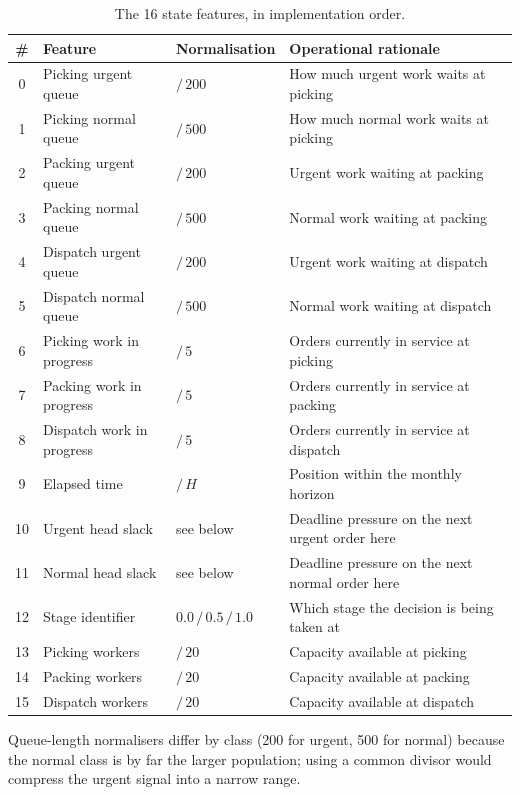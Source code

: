 \begin{table}[htbp]
\centering
\caption[RL-3 state features]{The 16 state features, in implementation order.}
\label{tab:rl-state}
\scriptsize
\begin{tabularx}{\textwidth}{clp{2.6cm}X}
\toprule
\textbf{\#} & \textbf{Feature} & \textbf{Normalisation} & \textbf{Operational rationale} \\
\midrule
0  & Picking urgent queue   & \(/\,200\) & How much urgent work waits at picking \\
1  & Picking normal queue   & \(/\,500\) & How much normal work waits at picking \\
2  & Packing urgent queue   & \(/\,200\) & Urgent work waiting at packing \\
3  & Packing normal queue   & \(/\,500\) & Normal work waiting at packing \\
4  & Dispatch urgent queue  & \(/\,200\) & Urgent work waiting at dispatch \\
5  & Dispatch normal queue  & \(/\,500\) & Normal work waiting at dispatch \\
6  & Picking work in progress  & \(/\,5\) & Orders currently in service at picking \\
7  & Packing work in progress  & \(/\,5\) & Orders currently in service at packing \\
8  & Dispatch work in progress & \(/\,5\) & Orders currently in service at dispatch \\
9  & Elapsed time & \(/\,H\) & Position within the monthly horizon \\
10 & Urgent head slack & see below & Deadline pressure on the next urgent order here \\
11 & Normal head slack & see below & Deadline pressure on the next normal order here \\
12 & Stage identifier & \(0.0\,/\,0.5\,/\,1.0\) & Which stage the decision is being taken at \\
13 & Picking workers  & \(/\,20\) & Capacity available at picking \\
14 & Packing workers  & \(/\,20\) & Capacity available at packing \\
15 & Dispatch workers & \(/\,20\) & Capacity available at dispatch \\
\bottomrule
\end{tabularx}
\end{table}

Queue-length normalisers differ by class (\num{200} for urgent, \num{500} for normal) because
the normal class is by far the larger population; using a common divisor would compress the
urgent signal into a narrow range.

